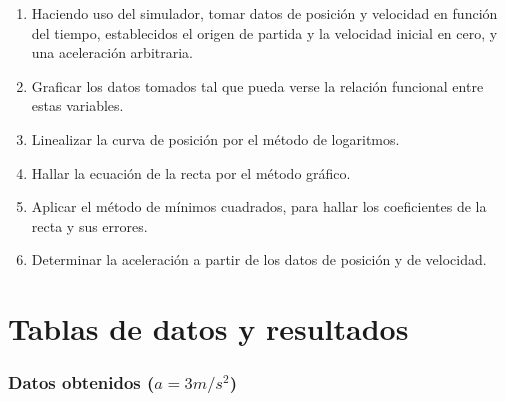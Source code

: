 \documentclass[letter,11pt]{article}
\begin{document}
\begin{enumerate}
\item Haciendo uso del simulador, tomar datos de posición y velocidad en función
    del tiempo, establecidos el origen de partida y la velocidad inicial en
    cero, y una aceleración arbitraria.
\item Graficar los datos tomados tal que pueda verse la relación funcional entre
    estas variables.
\item Linealizar la curva de posición por el método de logaritmos.
\item Hallar la ecuación de la recta por el método gráfico.
\item Aplicar el método de mínimos cuadrados, para hallar los coeficientes de la
    recta y sus errores.
\item Determinar la aceleración a partir de los datos de posición y de
    velocidad.
\end{enumerate}

\section{Tablas de datos y resultados}

\subsubsection{Datos obtenidos ($a=3m/s^2$)}
\end{document}
